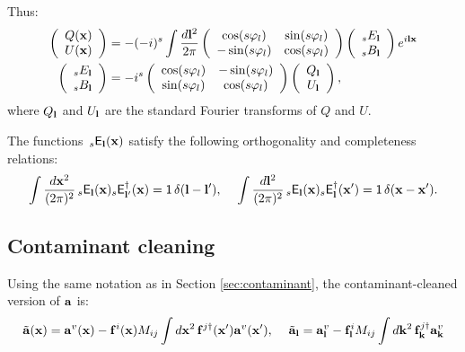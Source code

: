 \documentclass[a4paper,10pt]{article}
\begin{document}
    Thus:
    \begin{align}
      \left(\begin{array}{c}
       Q({\bf x}) \\ U({\bf x})
      \end{array}\right)
      &=-(-i)^s
      \int\frac{d{\bf l}^2}{2\pi}
      \left(\begin{array}{cc}
              \cos(s\varphi_l) & \sin(s\varphi_l) \\
             -\sin(s\varphi_l) & \cos(s\varphi_l) \\
            \end{array}\right)
      \left(\begin{array}{c}
       _sE_{\bf l} \\ _sB_{\bf l}
      \end{array}\right)e^{i{\bf l}{\bf x}}\\
      \left(\begin{array}{c}
       _sE_{\bf l} \\ _sB_{\bf l}
      \end{array}\right)
      &=-i^s
      \left(\begin{array}{cc}
              \cos(s\varphi_l) & -\sin(s\varphi_l) \\
              \sin(s\varphi_l) &  \cos(s\varphi_l) \\
            \end{array}\right)
      \left(\begin{array}{c}
       Q_{\bf l} \\ U_{\bf l}
      \end{array}\right),
    \end{align}
    where $Q_{\bf l}$ and $U_{\bf l}$ are the standard Fourier transforms of $Q$ and $U$.
    
    The functions $\,_s{\sf E}_{\bf l}({\bf x})$ satisfy the following orthogonality and completeness relations:
    \begin{equation}
      \int \frac{d{\bf x}^2}{(2\pi)^2}\,_s{\sf E}_{\bf l}({\bf x})_s{\sf E}^\dag_{{\bf l}'}({\bf x})={\sf 1}\,\delta({\bf l}-{\bf l}'),\hspace{12pt}
      \int \frac{d{\bf l}^2}{(2\pi)^2}\,_s{\sf E}_{\bf l}({\bf x})_s{\sf E}^\dag_{{\bf l}}({\bf x}')={\sf 1}\,\delta({\bf x}-{\bf x}').
    \end{equation}


  \subsection{Contaminant cleaning}
    Using the same notation as in Section \ref{sec:contaminant}, the contaminant-cleaned version of ${\bf a}$ is:
    \begin{equation}
      \tilde{\bf a}({\bf x})={\bf a}^v({\bf x})-{\bf f}^i({\bf x})M_{ij}\int d{\bf x}^2\,{\bf f}^{j\dag}({\bf x}'){\bf a}^v({\bf x}'),\hspace{12pt}
      \tilde{\bf a}_{\bf l}={\bf a}^v_{\bf l}-{\bf f}^i_{\bf l}M_{ij}\int d{\bf k}^2\,{\bf f}^{j\dag}_{\bf k}{\bf a}^v_{\bf k}
    \end{equation}
\end{document}
